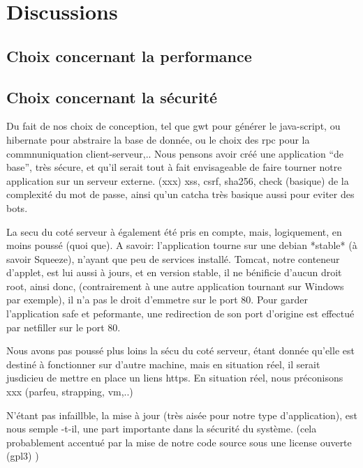 \chapter{Discussions}
\section{Choix concernant la performance}
\section{Choix concernant la sécurité}

Du fait de nos choix de conception, tel que gwt pour générer le java-script, ou
hibernate pour abstraire la base de donnée, ou le choix des rpc pour la
commnuniquation client-serveur,..  Nous pensons avoir créé une application ``de
base'', très sécure, et qu'il serait tout à fait envisageable de faire tourner notre
application sur un serveur externe.
(xxx) xss, csrf, sha256, check (basique) de la complexité du mot de passe, ainsi
qu'un catcha très basique aussi pour eviter des bots.

La secu du coté serveur à également été pris en compte, mais, logiquement, en
moins poussé (quoi que).  A savoir: l'application tourne sur une debian *stable*
(à savoir Squeeze), n'ayant que peu de services installé.
Tomcat, notre conteneur d'applet, est lui aussi à jours, et en version stable,
il ne bénificie d'aucun droit root, ainsi donc, (contrairement à une autre
application tournant sur Windows par exemple), il n'a pas le droit d'emmetre sur
le port 80. Pour garder l'application safe et peformante, une redirection de
son port d'origine est effectué par netfiller sur le port 80.

Nous avons pas poussé plus loins la sécu du coté serveur, étant donnée qu'elle
est destiné à fonctionner sur d'autre machine, mais en situation réel, il serait
jusdicieu de mettre en place un liens https.  En situation réel, nous
préconisons xxx (parfeu, strapping, vm,..)

N'étant pas infaillble, la mise à jour (très aisée pour notre type
d'application), est nous semple -t-il, une part importante dans la sécurité du
système. (cela probablement accentué par la mise de notre code source sous une
license ouverte (gpl3) )
